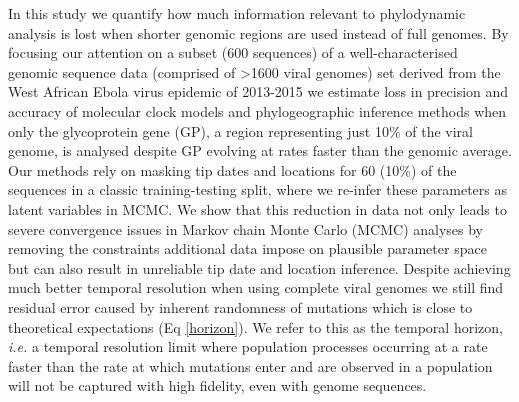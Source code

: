 \documentclass[11pt,oneside,letterpaper]{article}
\begin{document}
In this study we quantify how much information relevant to phylodynamic analysis is lost when shorter genomic regions are used instead of full genomes.
By focusing our attention on a subset (600 sequences) of a well-characterised genomic sequence data (comprised of >1600 viral genomes) set derived from the West African Ebola virus epidemic of 2013-2015 \citep{dudas_virus_2017} we estimate loss in precision and accuracy of molecular clock models and phylogeographic inference methods when only the glycoprotein gene (GP), a region representing just 10\% of the viral genome, is analysed despite GP evolving at rates faster than the genomic average.
Our methods rely on masking tip dates and locations for 60 (10\%) of the sequences in a classic training-testing split, where we re-infer these parameters as latent variables in MCMC.
We show that this reduction in data not only leads to severe convergence issues in Markov chain Monte Carlo (MCMC) analyses by removing the constraints additional data impose on plausible parameter space but can also result in unreliable tip date and location inference.
Despite achieving much better temporal resolution when using complete viral genomes we still find residual error caused by inherent randomness of mutations which is close to theoretical expectations (Eq \ref{horizon}).
We refer to this as the temporal horizon, \textit{i.e.} a temporal resolution limit where population processes occurring at a rate faster than the rate at which mutations enter and are observed in a population will not be captured with high fidelity, even with genome sequences.
\end{document}
